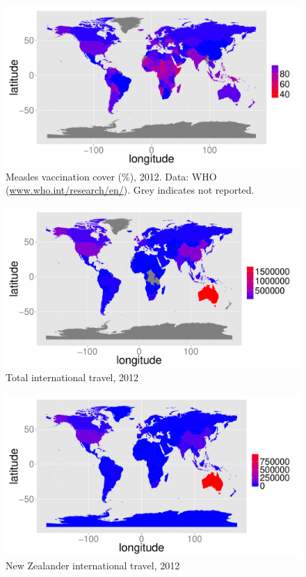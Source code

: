 \documentclass{article}
\begin{document}
\begin{figure}
\begin{center}
\includegraphics{draftfinalreport-038}
\end{center}
\caption{Measles vaccination cover (\%), 2012. Data: WHO (\href{http://www.who.int/research/en/}{www.who.int/research/en/}). Grey indicates not reported.}
\label{fig:cover12}
\end{figure}


\begin{figure}
\begin{center}
\includegraphics{draftfinalreport-039}
\end{center}
\caption{Total international travel, 2012 }
\label{fig:travel12}
\end{figure}

\begin{figure}
\begin{center}
\includegraphics{draftfinalreport-040}
\end{center}
\caption{New Zealander international travel, 2012 }
\label{fig:nztravel12}
\end{figure}
\end{document}
